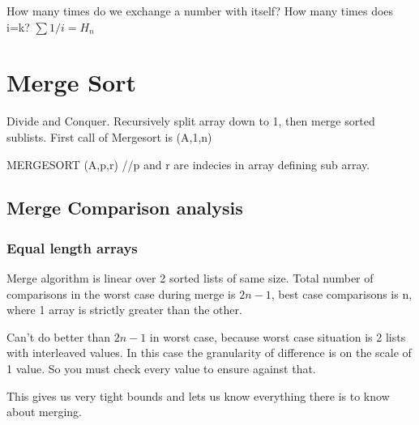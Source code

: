 \documentclass[english, 10pt]{article}
\begin{document}
How many times do we exchange a number with itself? How many times does i=k?
$\sum 1/i = H_n$



\section{Merge Sort}
Divide and Conquer. Recursively split array down to 1, then merge sorted sublists.
First call of Mergesort is (A,1,n) \\


\begin{algorithm}[H]
    MERGESORT (A,p,r)\;
    //p and r are indecies in array defining sub array.\;
\end{algorithm}


\subsection{Merge Comparison analysis}
\subsubsection{Equal length arrays}
Merge algorithm is linear over 2 sorted lists of same size. Total number of comparisons in the worst case during merge is $2n-1$, best case comparisons is n, where
1 array is strictly greater than the other.

Can't do better than $2n-1$ in worst case, because worst case situation is 2 lists with interleaved values. In this case the granularity of difference is on the scale of 1 value. So you must check every value to ensure against that.

This gives us very tight bounds and lets us know everything there is to know about merging.
\end{document}

